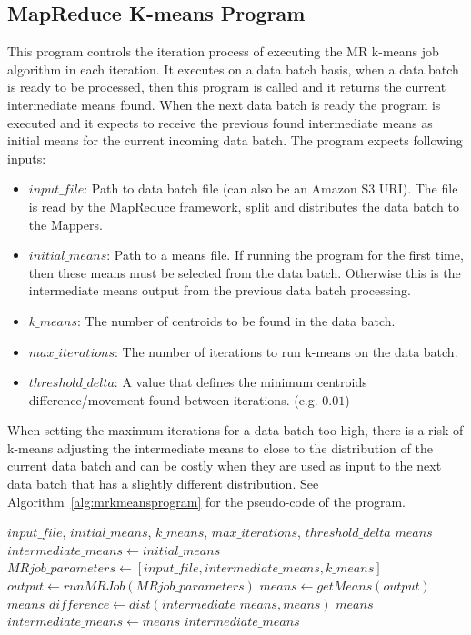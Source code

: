 \subsection{MapReduce K-means Program}
\label{sec:mrkmeansprogram}
This program controls the iteration process of executing the MR k-means job algorithm in each iteration. It executes on a data batch basis, when a data batch is ready to be processed, then this program is called and it returns the current intermediate means found. When the next data batch is ready the program is executed and it expects to receive the previous found intermediate means as initial means for the current incoming data batch. The program expects following inputs:
\begin{itemize}
\item $input\_file$: Path to data batch file (can also be an Amazon S3 URI). The file is read by the MapReduce framework, split and distributes the data batch to the Mappers.
\item $initial\_means$: Path to a means file. If running the program for the first time, then these means must be selected from the data batch. Otherwise this is the intermediate means output from the previous data batch processing.
\item $k\_means$: The number of centroids to be found in the data batch.
\item $max\_iterations$: The number of iterations to run k-means on the data batch.
\item $threshold\_delta$: A value that defines the minimum centroids difference/movement found between iterations. (e.g. $0.01$)
\end{itemize}

When setting the maximum iterations for a data batch too high, there is a risk of k-means adjusting the intermediate means to close to the distribution of the current data batch and can be costly when they are used as input to the next data batch that has a slightly different distribution. See Algorithm~\ref{alg:mrkmeansprogram} for the pseudo-code of the program.


\begin{center}
\newcommand{\map}{\ensuremath{\mbox{\sc MapReduce Kmeans Program}}}
\begin{algorithm}[h!]
\caption{$\map()$}\label{alg:mrkmeansprogram}
\begin{algorithmic}[1]
\REQUIRE $input\_file$, $initial\_means$, $k\_means$, $max\_iterations$, $threshold\_delta$
\ENSURE $means$
\medskip
\STATE $intermediate\_means \leftarrow initial\_means$
	\STATE $MRjob\_parameters \leftarrow [input\_file, intermediate\_means, k\_means]$
	\STATE $output \leftarrow run MRJob(MRjob\_parameters)$
	\STATE $means \leftarrow getMeans(output)$
	\medskip
	\STATE $means\_difference \leftarrow dist(intermediate\_means, means)$
		\RETURN $means$
	\ELSE
		\STATE $intermediate\_means \leftarrow means$
	\ENDIF
\ENDFOR
\medskip
\RETURN $intermediate\_means$
\end{algorithmic}
\end{algorithm}
\end{center}


